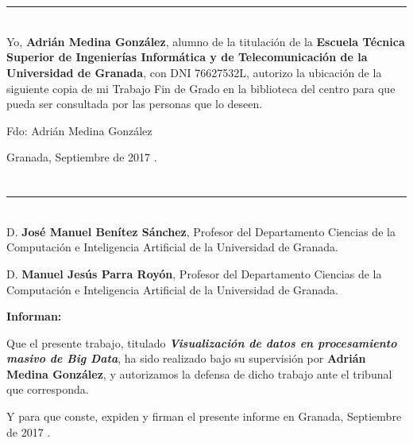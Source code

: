 \chapter*{}
\thispagestyle{empty}

\noindent\rule[-1ex]{\textwidth}{2pt}\\[4.5ex]

Yo, \textbf{Adrián Medina González}, alumno de la titulación de la \textbf{Escuela Técnica Superior
de Ingenierías Informática y de Telecomunicación de la Universidad de Granada}, con DNI 76627532L, autorizo la
ubicación de la siguiente copia de mi Trabajo Fin de Grado en la biblioteca del centro para que pueda ser
consultada por las personas que lo deseen.

\vspace{6cm}

\noindent Fdo: Adrián Medina González

\vspace{2cm}

\begin{flushright}
Granada, Septiembre de 2017 .
\end{flushright}


\chapter*{}

\noindent\rule[-1ex]{\textwidth}{2pt}\\[4.5ex]

D. \textbf{José Manuel Benítez Sánchez}, Profesor del Departamento Ciencias de la Computación e Inteligencia Artificial de la Universidad de Granada.

D. \textbf{Manuel Jesús Parra Royón}, Profesor del Departamento Ciencias de la Computación e Inteligencia Artificial de la Universidad de Granada.

\textbf{Informan:}

Que el presente trabajo, titulado \textit{\textbf{Visualización de datos en procesamiento masivo de Big Data}},
ha sido realizado bajo su supervisión por \textbf{Adrián Medina González}, y autorizamos la defensa de dicho trabajo ante el tribunal
que corresponda.


Y para que conste, expiden y firman el presente informe en Granada, Septiembre de 2017 .

